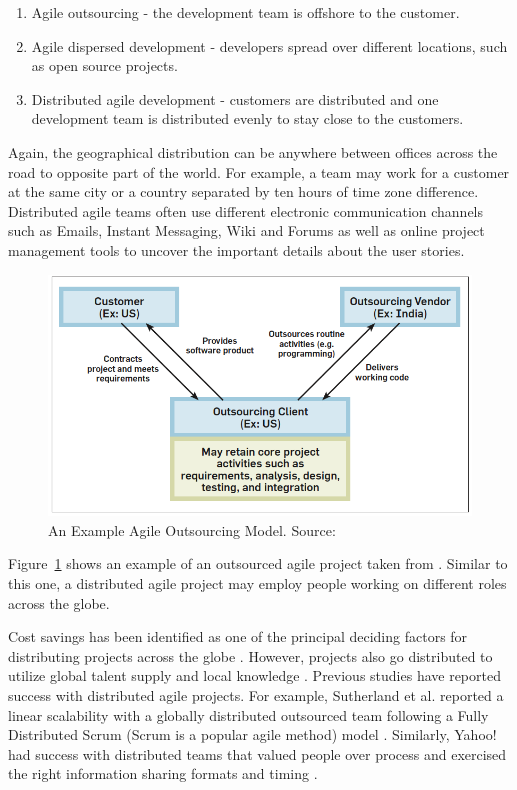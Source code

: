 \begin{enumerate}
	\item Agile outsourcing - the development team is offshore to the customer.
	\item Agile dispersed development - developers spread over different locations, such as open source projects.
	\item Distributed agile development - customers are distributed and one development team is distributed evenly to stay close to the customers.
\end{enumerate}

Again, the geographical distribution can be anywhere between offices across the road to opposite part of the world. For example, a team may work for a customer at the same city or a country separated by ten hours of time zone difference. Distributed agile teams often use different electronic communication channels such as Emails, Instant Messaging, Wiki and Forums as well as online project management tools to uncover the important details about the user stories.

\begin{figure}[bt]
	\centering
	\includegraphics[width=\textwidth]{Distributed.png}
    \caption{An Example Agile Outsourcing Model. Source: \cite{modified_agile}}
	\label{fig:distributed}
\end{figure}

Figure~\ref{fig:distributed} shows an example of an outsourced agile project taken from \cite{modified_agile}. Similar to this one, a distributed agile project may employ people working on different roles across the globe.

Cost savings has been identified as one of the principal deciding factors for distributing projects across the globe \cite{practical_considerations}. However, projects also go distributed to utilize global talent supply and local knowledge \cite{fully_distributed, modified_agile}. Previous studies have reported success with distributed agile projects. For example, Sutherland et al. reported a linear scalability with a globally distributed outsourced team following a Fully Distributed Scrum (Scrum is a popular agile method) model \cite{fully_distributed}. Similarly, Yahoo! had success with distributed teams that valued people over process and exercised the right information sharing formats and timing \cite{yahoo}.

